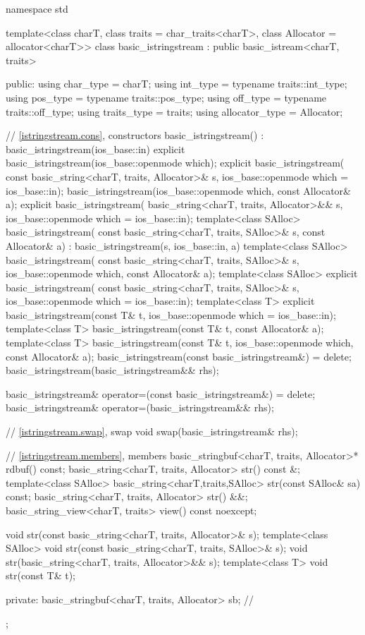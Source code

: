 %
\begin{codeblock}
namespace std {
  template<class charT, class traits = char_traits<charT>,
           class Allocator = allocator<charT>>
  class basic_istringstream : public basic_istream<charT, traits> {
  public:
    using char_type      = charT;
    using int_type       = typename traits::int_type;
    using pos_type       = typename traits::pos_type;
    using off_type       = typename traits::off_type;
    using traits_type    = traits;
    using allocator_type = Allocator;

    // \ref{istringstream.cons}, constructors
    basic_istringstream() : basic_istringstream(ios_base::in) {}
    explicit basic_istringstream(ios_base::openmode which);
    explicit basic_istringstream(
      const basic_string<charT, traits, Allocator>& s,
      ios_base::openmode which = ios_base::in);
    basic_istringstream(ios_base::openmode which, const Allocator& a);
    explicit basic_istringstream(
      basic_string<charT, traits, Allocator>&& s,
      ios_base::openmode which = ios_base::in);
    template<class SAlloc>
      basic_istringstream(
        const basic_string<charT, traits, SAlloc>& s, const Allocator& a)
        : basic_istringstream(s, ios_base::in, a) {}
    template<class SAlloc>
      basic_istringstream(
        const basic_string<charT, traits, SAlloc>& s,
        ios_base::openmode which, const Allocator& a);
    template<class SAlloc>
      explicit basic_istringstream(
        const basic_string<charT, traits, SAlloc>& s,
        ios_base::openmode which = ios_base::in);
    template<class T>
      explicit basic_istringstream(const T& t, ios_base::openmode which = ios_base::in);
    template<class T>
      basic_istringstream(const T& t, const Allocator& a);
    template<class T>
      basic_istringstream(const T& t, ios_base::openmode which, const Allocator& a);
    basic_istringstream(const basic_istringstream&) = delete;
    basic_istringstream(basic_istringstream&& rhs);

    basic_istringstream& operator=(const basic_istringstream&) = delete;
    basic_istringstream& operator=(basic_istringstream&& rhs);

    // \ref{istringstream.swap}, swap
    void swap(basic_istringstream& rhs);

    // \ref{istringstream.members}, members
    basic_stringbuf<charT, traits, Allocator>* rdbuf() const;
    basic_string<charT, traits, Allocator> str() const &;
    template<class SAlloc>
      basic_string<charT,traits,SAlloc> str(const SAlloc& sa) const;
    basic_string<charT, traits, Allocator> str() &&;
    basic_string_view<charT, traits> view() const noexcept;

    void str(const basic_string<charT, traits, Allocator>& s);
    template<class SAlloc>
      void str(const basic_string<charT, traits, SAlloc>& s);
    void str(basic_string<charT, traits, Allocator>&& s);
    template<class T>
      void str(const T& t);

  private:
    basic_stringbuf<charT, traits, Allocator> sb;   // \expos
  };
}
\end{codeblock}

